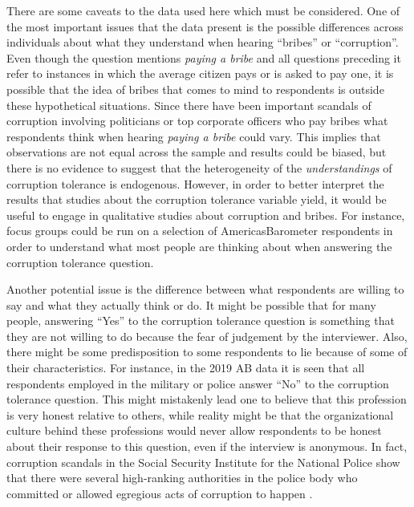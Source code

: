 \documentclass[floatsintext,man]{apa7}\usepackage[]{graphicx}\usepackage[]{color}
\begin{document}
There are some caveats to the data used here which must be considered. One of the most important issues that the data present is the possible differences across individuals about what they understand when hearing \enquote{bribes} or \enquote{corruption}. Even though the question mentions \textit{paying a bribe} and all questions preceding it refer to instances in which the average citizen pays or is asked to pay one, it is possible that the idea of bribes that comes to mind to respondents is outside these hypothetical situations. Since there have been important scandals of corruption involving politicians or top corporate officers who pay bribes what respondents think when hearing \textit{paying a bribe} could vary. This implies that observations are not equal across the sample and results could be biased, but there is no evidence to suggest that the heterogeneity of the \textit{understandings} of corruption tolerance is endogenous. However, in order to better interpret the results that studies about the corruption tolerance variable yield, it would be useful to engage in qualitative studies about corruption and bribes. For instance, focus groups could be run on a selection of AmericasBarometer respondents in order to understand what most people are thinking about when answering the corruption tolerance question.

Another potential issue is the difference between what respondents are willing to say and what they actually think or do. It might be possible that for many people, answering \enquote{Yes} to the corruption tolerance question is something that they are not willing to do because the fear of judgement by the interviewer. Also, there might be some predisposition to some respondents to lie because of some of their characteristics. For instance, in the 2019 AB data it is seen that all respondents employed in the military or police answer \enquote{No} to the corruption tolerance question. This might mistakenly lead one to believe that this profession is very honest relative to others, while reality might be that the organizational culture behind these professions would never allow respondents to be honest about their response to this question, even if the interview is anonymous. In fact, corruption scandals in the Social Security Institute for the National Police show that there were several high-ranking authorities in the police body who committed or allowed egregious acts of corruption to happen \parencite{Molina.2021}. 
\end{document}
